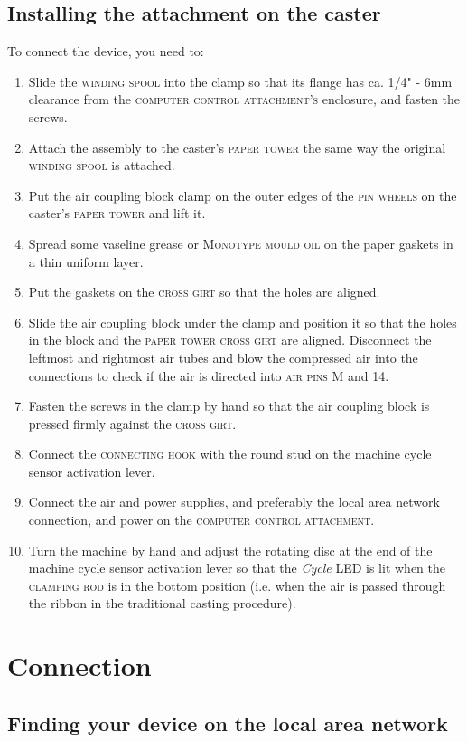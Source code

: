 \documentclass[draft, 12pt, a4paper]{book}
\begin{document}
\section{Installing the attachment on the caster}
To connect the device, you need to:
\begin{enumerate}
\item Slide the \textsc{winding spool} into the clamp so that its flange has ca. 1/4" - 6mm clearance from the \textsc{computer control attachment's} enclosure, and fasten the screws.
\item Attach the assembly to the caster's \textsc{paper tower} the same way the original \textsc{winding spool} is attached.
\item Put the air coupling block clamp on the outer edges of the \textsc{pin wheels} on the caster's \textsc{paper tower} and lift it.
\item Spread some vaseline grease or \textsc{Monotype mould oil} on the paper gaskets in a thin uniform layer.
\item Put the gaskets on the \textsc{cross girt} so that the holes are aligned.
\item Slide the air coupling block under the clamp and position it so that the holes in the block and the \textsc{paper tower cross girt} are aligned. Disconnect the leftmost and rightmost air tubes and blow the compressed air into the connections to check if the air is directed into \textsc{air pins} M and 14.
\item Fasten the screws in the clamp by hand so that the air coupling block is pressed firmly against the \textsc{cross girt}.
\item Connect the \textsc{connecting hook} with the round stud on the machine cycle sensor activation lever.
\item Connect the air and power supplies, and preferably the local area network connection, and power on the \textsc{computer control attachment}.
\item Turn the machine by hand and adjust the rotating disc at the end of the machine cycle sensor activation lever so that the \textit{Cycle} LED is lit when the \textsc{clamping rod} is in the bottom position (i.e. when the air is passed through the ribbon in the traditional casting procedure).
\end{enumerate}
\chapter{Connection}
\section{Finding your device on the local area network}
\end{document}
